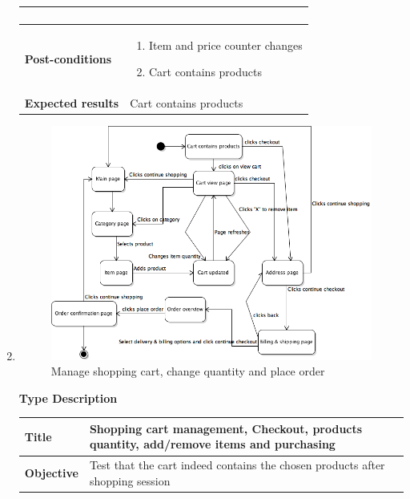 \documentclass[UKenglish,12pt]{article}
\begin{document}
\begin{enumerate}
\begin{tabular}{| p{5cm} | p{10cm} | }
\begin{enumerate}
	 \end{enumerate} \\ \hline
	 \textbf{Post-conditions} & \begin{enumerate} \item Item and price counter changes \item Cart contains products \end{enumerate}  \\ \hline
	 \textbf{Expected results} & Cart contains products \\ 
	 \hline
\end{tabular} %



\item %
\begin{figure}[!h]
\centering
\includegraphics[scale=0.60,keepaspectratio]{Images/BuyProductsandChangeCart.png}
\caption{Manage shopping cart, change quantity and place order}
\end{figure}
\newpage
\textbf{\hspace{0.3cm}Type\hspace{4.4cm} Description}
\newline \vspace{0.2cm}
\begin{tabular}{| p{5cm} | p{10cm} | }
	\hline
	 \textbf{Title} & Shopping cart management, Checkout, products quantity, add/remove items and purchasing \\ \hline
	 \textbf{Objective} & Test that the cart indeed contains the chosen products after shopping session \\ \hline

\end{tabular}
\end{enumerate}
\end{document}
